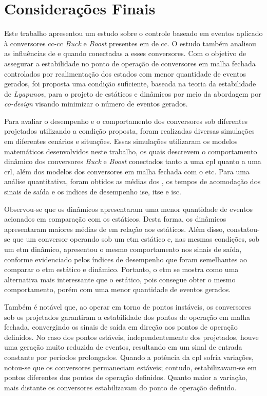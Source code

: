 \chapter{Considerações Finais} \label{cap5}

Este trabalho apresentou um estudo sobre o controle baseado em eventos aplicado à conversores \acrshort{cc}-\acrshort{cc} \textit{Buck} e \textit{Boost} presentes em  de \acrshort{cc}. O estudo também analisou as influências de  e  quando conectadas a esses conversores. Com o objetivo de assegurar a estabilidade no ponto de operação de conversores em malha fechada controlados por realimentação dos estados com menor quantidade de eventos gerados, foi proposta uma condição suficiente, baseada na teoria da estabilidade de \textit{Lyapunov}, para o projeto de  estáticos e dinâmicos por meio da abordagem por \textit{co-design} visando minimizar o número de eventos gerados.

Para avaliar o desempenho e o comportamento dos conversores sob diferentes  projetados utilizando a condição proposta, foram realizadas diversas simulações em diferentes cenários e situações. Essas simulações utilizaram os modelos matemáticos desenvolvidos neste trabalho, os quais descrevem o comportamento dinâmico dos conversores \textit{Buck} e \textit{Boost} conectados tanto a uma \acrshort{cpl} quanto a uma \acrshort{crl}, além dos modelos dos conversores em malha fechada com o \acrshort{etc}. Para uma análise quantitativa, foram obtidos as médias dos , os tempos de acomodação dos sinais de saída e os indices de desempenho \acrshort{ise}, \acrshort{itse} e \acrshort{isc}.

Observou-se que os  dinâmicos apresentaram uma menor quantidade de eventos acionados em comparação com os  estáticos. Desta forma, os  dinâmicos apresentaram maiores médias de  em relação aos estáticos. Além disso, constatou-se que um conversor operando sob um \acrshort{etm} estático e, nas mesmas condições, sob um \acrshort{etm} dinâmico, apresentou o mesmo comportamento nos sinais de saída, conforme evidenciado pelos índices de desempenho que foram semelhantes ao comparar o \acrshort{etm} estático e dinâmico. Portanto, o \acrshort{etm} se mostra como uma alternativa mais interessante que o estático, pois consegue obter o mesmo comportamento, porém com uma menor quantidade de eventos gerados.

Também é notável que, ao operar em torno de pontos instáveis, os conversores sob os  projetados garantiram a estabilidade dos pontos de operação em malha fechada, convergindo os sinais de saída em direção aos pontos de operação definidos. No caso dos pontos estáveis, independentemente dos  projetados, houve uma geração muito reduzida de eventos, resultando em um sinal de entrada constante por períodos prolongados. Quando a potência da \acrshort{cpl} sofria variações, notou-se que os conversores permaneciam estáveis; contudo, estabilizavam-se em pontos diferentes dos pontos de operação definidos. Quanto maior a variação, mais distante os conversores estabilizavam do ponto de operação definido.

